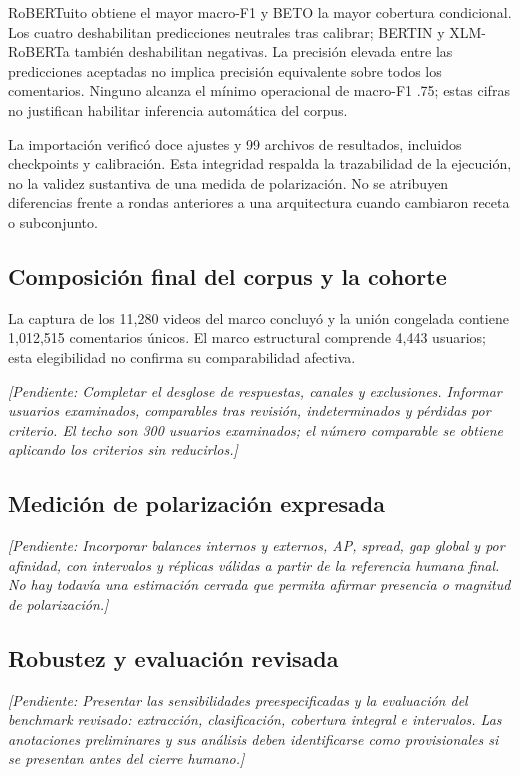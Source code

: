 \documentclass[conference,letterpaper]{IEEEtran}
\newcommand{\pendiente}[1]{\par\smallskip\noindent\textit{[Pendiente: #1]}\par\smallskip}
\begin{document}
RoBERTuito obtiene el mayor macro-F1 y BETO la mayor cobertura condicional. Los cuatro deshabilitan predicciones neutrales tras calibrar; BERTIN y XLM-RoBERTa también deshabilitan negativas. La precisión elevada entre las predicciones aceptadas no implica precisión equivalente sobre todos los comentarios. Ninguno alcanza el mínimo operacional de macro-F1 .75; estas cifras no justifican habilitar inferencia automática del corpus.

La importación verificó doce ajustes y 99 archivos de resultados, incluidos checkpoints y calibración. Esta integridad respalda la trazabilidad de la ejecución, no la validez sustantiva de una medida de polarización. No se atribuyen diferencias frente a rondas anteriores a una arquitectura cuando cambiaron receta o subconjunto.

\subsection{Composición final del corpus y la cohorte}
La captura de los 11,280 videos del marco concluyó y la unión congelada contiene 1,012,515 comentarios únicos. El marco estructural comprende 4,443 usuarios; esta elegibilidad no confirma su comparabilidad afectiva.
\pendiente{Completar el desglose de respuestas, canales y exclusiones. Informar usuarios examinados, comparables tras revisión, indeterminados y pérdidas por criterio. El techo son 300 usuarios examinados; el número comparable se obtiene aplicando los criterios sin reducirlos.}

\subsection{Medición de polarización expresada}
\pendiente{Incorporar balances internos y externos, AP, spread, gap global y por afinidad, con intervalos y réplicas válidas a partir de la referencia humana final. No hay todavía una estimación cerrada que permita afirmar presencia o magnitud de polarización.}

\subsection{Robustez y evaluación revisada}
\pendiente{Presentar las sensibilidades preespecificadas y la evaluación del benchmark revisado: extracción, clasificación, cobertura integral e intervalos. Las anotaciones preliminares y sus análisis deben identificarse como provisionales si se presentan antes del cierre humano.}
\end{document}

